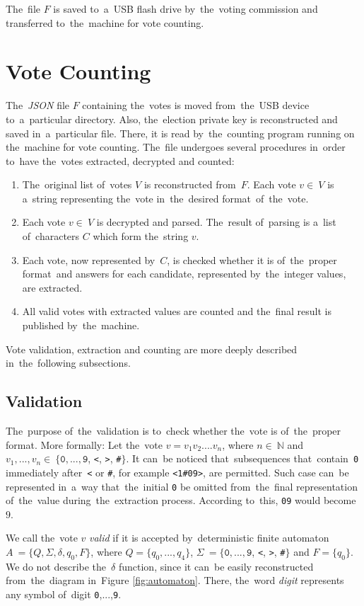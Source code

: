 The~file $F$ is saved to~a~USB flash drive by~the~voting commission and transferred to~the~machine for vote counting.

\section{Vote Counting}
The~\emph{JSON} file $F$ containing the~votes is moved from~the~USB device to~a~particular directory. Also, the~election private key is reconstructed and saved in~a~particular file. There, it is read by~the~counting program running on the~machine for vote counting. The~file undergoes several procedures in~order to~have the~votes extracted, decrypted and counted:
\begin{enumerate}
\item The~original list of~votes $V$ is reconstructed from~$F$. Each vote $v \in~V$ is a~string representing the~vote in~the~desired format~of~the~vote.
\item Each vote $v \in~V$ is decrypted and parsed. The~result of~parsing is a~list of~characters $C$ which form the~string $v$.
\item Each vote, now represented by~$C$, is checked whether it is of~the~proper format~and answers for each candidate, represented by~the~integer values, are extracted.
\item All valid votes with extracted values are counted and the~final result is published by~the~machine.
\end{enumerate}

Vote validation, extraction and counting are more deeply described in~the~following subsections.

\subsection{Validation}
The~purpose of~the~validation is to~check whether the~vote is of~the~proper format. More formally: \newline Let the~vote $v = v_1v_2....v_n$, where $n \in~\mathbb{N}$ and $v_1, ..., v_n \in~\{\texttt{0},...,\texttt{9}$, \texttt{<}, \texttt{>}, \texttt{\#}$\}$. It can~be noticed that~subsequences that~contain~\texttt{0} immediately after~\texttt{<} or \texttt{\#}, for example \texttt{<1\#09>}, are permitted. Such case can~be represented in~a~way that~the~initial \texttt{0} be omitted from~the~final representation of~the~value during~the~extraction process. According to~this, \texttt{09} would become $9$.

We call the~vote $v$ \emph{valid} if it is accepted by~deterministic finite automaton $A~=\{Q, \Sigma, \delta, q_0, F\}$, 
where $Q = \{q_0, ..., q_4\}$, $\Sigma~= \{\texttt{0},...,\texttt{9}$, \texttt{<}, \texttt{>}, \texttt{\#}$\}$ and $F = \{q_0\}$. We do not describe the~$\delta$ function, since it can~be easily reconstructed from~the~diagram in~Figure \ref{fig:automaton}. There, the~word \emph{digit} represents any symbol of~digit \texttt{0},...,\texttt{9}.

